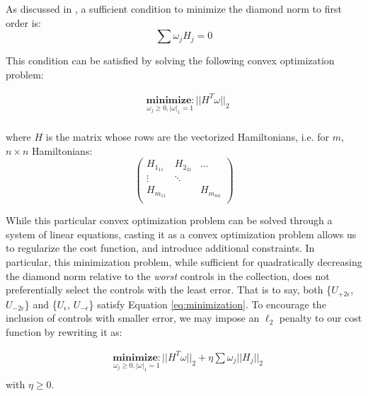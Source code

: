 \documentclass[aps,nofootinbib,pra,notitlepage,twocolumn]{revtex4-1}
\begin{document}
As discussed in \cite{Campbell2017}, a sufficient condition to minimize the diamond norm to first order is:
\begin{equation}\label{eq:campbell-condition}
\sum \omega_j H_j = 0
\end{equation}

This condition can be satisfied by solving the following convex optimization problem:

\begin{equation}\label{eq:minimization}
  \begin{split}
    &\underset{\omega_j\geq0, |\omega|_1=1}{\textbf{minimize}: } ||H^T\omega||_2\\
  \end{split}
\end{equation}

where $H$ is the matrix whose rows are the vectorized Hamiltonians, i.e. for $m$, $n\times n$ Hamiltonians:
\begin{equation}\label{eq:vectorized_hamiltonians}
	\left(\begin{array}{cccc}
		H_{1_{11}} & H_{2_{21}} & \ldots   \\ 
		\vdots\ & \ddots &    \\
		H_{m_{11}} &  &  H_{m_{nn}} \\ 
	\end{array} 	
	\right)
\end{equation}

While this particular convex optimization problem can be solved through a system of linear equations, casting it as a convex optimization problem allows us to regularize the cost function, and introduce additional constraints. In particular, this minimization problem, while sufficient for quadratically decreasing the diamond norm relative to the \textit{worst} controls in the collection, does not preferentially select the controls with the least error. That is to say, both \{$U_{+2\epsilon}$, $U_{-2\epsilon}$\} and \{$U_{\epsilon}$, $U_{-\epsilon}$\} satisfy Equation \ref{eq:minimization}. To encourage the inclusion of controls with smaller error, we may impose an $\ell_2$ penalty to our cost function by rewriting it as:

\begin{equation}\label{eq:minimization_l2}
  \begin{split}
    &\underset{\omega_j\geq0, |\omega|_1=1}{\textbf{minimize}:  }||H^T\omega||_2 + \eta\sum\omega_j||H_j||_2\\
  \end{split}
\end{equation}
with $\eta \geq 0$. 
\end{document}
